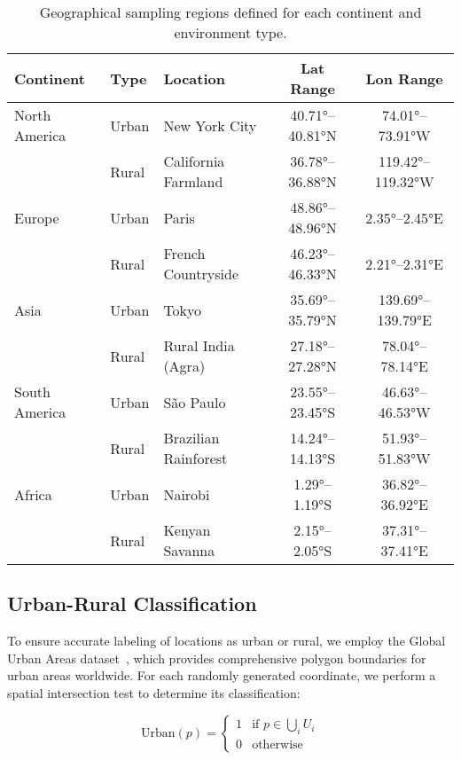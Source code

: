 \begin{table}[t]
\centering
\caption{Geographical sampling regions defined for each continent and environment type.}
\label{tab:sampling_regions}
\begin{tabular}{lllcc}
\toprule
\textbf{Continent} & \textbf{Type} & \textbf{Location} & \textbf{Lat Range} & \textbf{Lon Range} \\
\midrule
North America & Urban & New York City & 40.71°--40.81°N & 74.01°--73.91°W \\
              & Rural & California Farmland & 36.78°--36.88°N & 119.42°--119.32°W \\
\midrule
Europe & Urban & Paris & 48.86°--48.96°N & 2.35°--2.45°E \\
       & Rural & French Countryside & 46.23°--46.33°N & 2.21°--2.31°E \\
\midrule
Asia & Urban & Tokyo & 35.69°--35.79°N & 139.69°--139.79°E \\
     & Rural & Rural India (Agra) & 27.18°--27.28°N & 78.04°--78.14°E \\
\midrule
South America & Urban & São Paulo & 23.55°--23.45°S & 46.63°--46.53°W \\
              & Rural & Brazilian Rainforest & 14.24°--14.13°S & 51.93°--51.83°W \\
\midrule
Africa & Urban & Nairobi & 1.29°--1.19°S & 36.82°--36.92°E \\
       & Rural & Kenyan Savanna & 2.15°--2.05°S & 37.31°--37.41°E \\
\bottomrule
\end{tabular}
\end{table}

\subsection{Urban-Rural Classification}

To ensure accurate labeling of locations as urban or rural, we employ the Global Urban Areas dataset~\cite{schneider2010new}, which provides comprehensive polygon boundaries for urban areas worldwide. For each randomly generated coordinate, we perform a spatial intersection test to determine its classification:

\begin{equation}
\text{Urban}(p) = \begin{cases}
1 & \text{if } p \in \bigcup_{i} U_i \\
0 & \text{otherwise}
\end{cases}
\end{equation}


